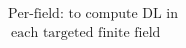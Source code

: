 \documentclass[preview]{standalone}
\begin{document}
\begin{align*}
\text{Per-field: to compute DL in} \\\ \text{each targeted finite field}
\end{align*}
\end{document}
